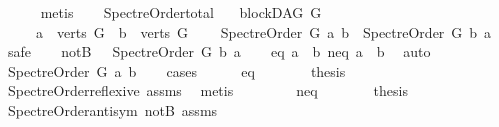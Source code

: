 \begin{isabellebody}
\ \ \ \ \isamarkupfalse%
\ {\isacharparenleft}{\kern0pt}metis{\isacharparenright}{\kern0pt}\isanewline
{}\isamarkupfalse%
%
\endisatagproof
{\isafoldproof}%
%
\isadelimproof
\ \ \isanewline
%
\endisadelimproof
\isanewline
{}\isamarkupfalse%
\ Spectre{\isacharunderscore}{\kern0pt}Order{\isacharunderscore}{\kern0pt}total{\isacharcolon}{\kern0pt}\isanewline
\ \ \ {\isachardoublequoteopen}blockDAG\ G{\isachardoublequoteclose}\isanewline
\ \ \ \ \ {\isachardoublequoteopen}a\ {\isasymin}\ verts\ G\ {\isasymand}\ b\ {\isasymin}\ verts\ G{\isachardoublequoteclose}\ \isanewline
\ \ \ {\isachardoublequoteopen}Spectre{\isacharunderscore}{\kern0pt}Order\ G\ a\ b\ {\isasymor}\ Spectre{\isacharunderscore}{\kern0pt}Order\ G\ b\ a{\isachardoublequoteclose}\isanewline
%
\isadelimproof
%
\endisadelimproof
%
\isatagproof
{}\isamarkupfalse%
\ safe\isanewline
\ \ \isamarkupfalse%
\ notB{\isacharcolon}{\kern0pt}\ {\isachardoublequoteopen}\ {\isasymnot}\ Spectre{\isacharunderscore}{\kern0pt}Order\ G\ b\ a{\isachardoublequoteclose}\isanewline
\ \ \isamarkupfalse%
\ {\isacharparenleft}{\kern0pt}eq{\isacharparenright}{\kern0pt}\ {\isachardoublequoteopen}a\ {\isacharequal}{\kern0pt}\ b{\isachardoublequoteclose}{\isacharbar}{\kern0pt}\ {\isacharparenleft}{\kern0pt}neq{\isacharparenright}{\kern0pt}\ {\isachardoublequoteopen}a\ {\isasymnoteq}\ b{\isachardoublequoteclose}\ \isamarkupfalse%
\ auto\isanewline
\ \ \isamarkupfalse%
\ \isamarkupfalse%
\ {\isachardoublequoteopen}Spectre{\isacharunderscore}{\kern0pt}Order\ G\ a\ b{\isachardoublequoteclose}\isanewline
\ \ \isamarkupfalse%
\ {\isacharparenleft}{\kern0pt}cases{\isacharparenright}{\kern0pt}\isanewline
\ \ \ \ \isamarkupfalse%
\ eq\isanewline
\ \ \ \ \isamarkupfalse%
\ \isamarkupfalse%
\ {\isacharquery}{\kern0pt}thesis\ \isamarkupfalse%
\ Spectre{\isacharunderscore}{\kern0pt}Order{\isacharunderscore}{\kern0pt}reflexive\ assms\ \isamarkupfalse%
\ metis\isanewline
\ \ \isamarkupfalse%
\isanewline
\ \ \ \ \isamarkupfalse%
\ neq\isanewline
\ \ \ \ \isamarkupfalse%
\ \isamarkupfalse%
\ {\isachardoublequoteopen}{\isacharquery}{\kern0pt}thesis{\isachardoublequoteclose}\ \isamarkupfalse%
\ Spectre{\isacharunderscore}{\kern0pt}Order{\isacharunderscore}{\kern0pt}antisym\ notB\ assms\isanewline

\end{isabellebody}
